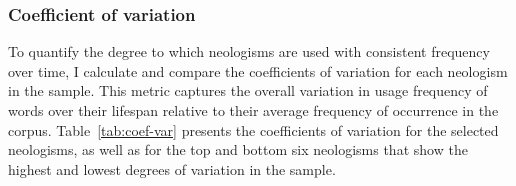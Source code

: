 \documentclass[
  a4paper,
  abstract=on,
  captions=tableabove
  ]{scrartcl}
\begin{document}
    \subsubsection{Coefficient of variation}
      \label{subsubsec:coef-var}

      To quantify the degree to which neologisms are used with consistent frequency over time, I calculate and compare the coefficients of variation for each neologism in the sample. This metric captures the overall variation in usage frequency of words over their lifespan relative to their average frequency of occurrence in the corpus. Table~\ref{tab:coef-var} presents the coefficients of variation for the selected neologisms, as well as for the top and bottom six neologisms that show the highest and lowest degrees of variation in the sample.
\end{document}
